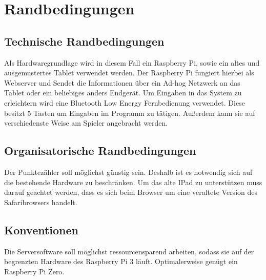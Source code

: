 \chapter{Randbedingungen}
\section{Technische Randbedingungen}
Als Hardwaregrundlage wird in diesem Fall ein Raspberry Pi, sowie ein altes und ausgemustertes Tablet verwendet werden. Der Raspberry Pi fungiert hierbei als Webserver und Sendet die Informationen über ein Ad-hog Netzwerk an das Tablet oder ein beliebiges anders Endgerät. Um Eingaben in das System zu erleichtern wird eine Bluetooth Low Energy Fernbedienung verwendet. Diese besitzt 5 Tasten um Eingaben im Programm zu tätigen. Außerdem kann sie auf verschiedenste Weise am Spieler angebracht werden.
\section{Organisatorische Randbedingungen}
Der Punktezähler soll möglichst günstig sein. Deshalb ist es notwendig sich auf die bestehende Hardware zu beschränken. Um das alte IPad zu unterstützen muss darauf geachtet werden, dass es sich beim Browser um eine veraltete Version des Safaribrowsers handelt.
\section{Konventionen}
Die Serversoftware soll möglichst ressourcensparend arbeiten, sodass sie auf der begrenzten Hardware des Raspberry Pi 3 läuft. Optimalerweise genügt ein Raspberry Pi Zero.
